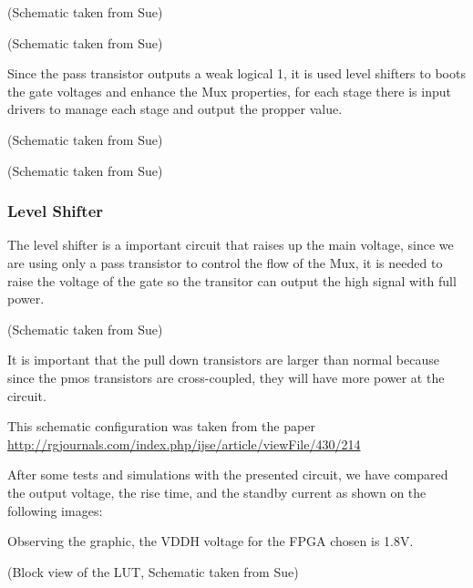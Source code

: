 \documentclass[letterpaper,10pt,english]{sphinxmanual}
\begin{document}
(Schematic taken from Sue)

\noindent{}

(Schematic taken from Sue)

Since the pass transistor outputs a weak logical 1, it is used level shifters to boots the gate voltages and enhance the Mux properties, for each stage there is input drivers to manage each stage and output the propper value.

\noindent{}

(Schematic taken from Sue)

\noindent{}

(Schematic taken from Sue)


\subsubsection{Level Shifter}
\label{levelshift::doc}\label{levelshift:level-shifter}
The level shifter is a important circuit that raises up the main voltage, since we are using only a pass transistor to control the flow of the Mux, it is needed to raise the voltage of the gate so the transitor can output the high signal with full power.

\noindent{}

(Schematic taken from Sue)

It is important that the pull down transistors are larger than normal because since the pmos transistors are cross-coupled, they will have more power at the circuit.

This schematic configuration was taken from the paper \url{http://rgjournals.com/index.php/ijse/article/viewFile/430/214}

After some tests and simulations with the presented circuit, we have compared the output voltage, the rise time, and the standby current as shown on the following images:

\noindent{}

\noindent{}

Observing the graphic, the VDDH voltage for the FPGA chosen is 1.8V.

\noindent{}

(Block view of the LUT, Schematic taken from Sue)

\noindent{}
\end{document}
